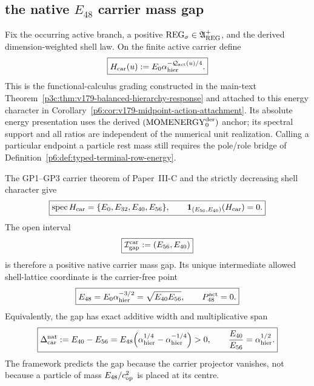 \documentclass[12pt,a4paper]{article}
\begin{document}
\subsection{the native \texorpdfstring{\(E_{48}\)}{E48} carrier mass gap}
\label{p6:sec:v165-native-e48-mass-gap}

\begin{definition}
\label{p6:def:v165-native-carrier-mass-energy}
Fix the occurring active branch, a positive
\(\mathrm{REG}_{\sigma}\in\mathfrak A_{\rm REG}^{+}\), and the derived
dimension-weighted shell law.  On the finite active carrier define
\begin{equation}
 \label{p6:eq:v165-native-carrier-mass-energy}
 \boxed{
 H_{\rm car}(u)
 :=E_0\alpha_{\rm hier}^{-\mathcal Q_{\rm act}(u)/4}.}
\end{equation}
This is the functional-calculus grading constructed in the main-text
Theorem~\ref{p3c:thm:v179-balanced-hierarchy-response} and attached to
this energy character in
Corollary~\ref{p6:cor:v179-midpoint-action-attachment}.
Its absolute energy presentation uses the derived
\((\mathrm{MOMENERGY}_{0}^{\rm der})\) anchor; its spectral support and all
ratios are independent of the numerical unit realization.  Calling a
particular endpoint a particle rest mass still requires the pole/role bridge
of Definition~\ref{p6:def:typed-terminal-row-energy}.
\end{definition}

\begin{theorem}
\label{p6:thm:v165-native-e48-carrier-mass-gap}
The GP1--GP3 carrier theorem of Paper~III-C and the strictly decreasing shell
character give
\begin{equation}
 \label{p6:eq:v165-native-carrier-energy-spectrum}
 \boxed{
 \operatorname{spec}H_{\rm car}
 =\{E_0,E_{32},E_{40},E_{56}\},
 \qquad
 \mathbf1_{(E_{56},E_{40})}(H_{\rm car})=0.}
\end{equation}
The open interval
\begin{equation}
 \label{p6:eq:v165-native-mass-gap-interval}
 \boxed{\mathcal I_{\rm gap}^{\rm car}:=(E_{56},E_{40})}
\end{equation}
is therefore a positive native carrier mass gap.  Its unique intermediate
allowed shell-lattice coordinate is the carrier-free point
\begin{equation}
 \label{p6:eq:v165-e48-gap-center}
 \boxed{
 E_{48}=E_0\alpha_{\rm hier}^{-3/2}
 =\sqrt{E_{40}E_{56}},
 \qquad P_{48}^{\rm act}=0.}
\end{equation}
Equivalently, the gap has exact additive width and multiplicative span
\begin{equation}
 \label{p6:eq:v165-native-mass-gap-width}
 \boxed{
 \Delta_{\rm car}^{\rm nat}
 :=E_{40}-E_{56}
 =E_{48}\!\left(\alpha_{\rm hier}^{1/4}
                 -\alpha_{\rm hier}^{-1/4}\right)>0,
 \qquad
 \frac{E_{40}}{E_{56}}=\alpha_{\rm hier}^{1/2}.}
\end{equation}
The framework predicts the gap because the carrier projector vanishes, not
because a particle of mass \(E_{48}/c_{\rm op}^2\) is placed at its centre.
\end{theorem}
\end{document}
